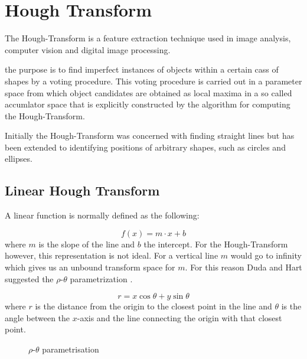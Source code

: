 \documentclass[11pt,twoside]{scrreprt}
\begin{document}

\section{Hough Transform} %
\label{sec:hough_transform}

The Hough-Transform is a feature extraction technique used in image analysis, computer vision and digital image processing.

the purpose is to find imperfect instances of objects within a certain cass of shapes by a voting procedure. This voting procedure is carried out in a parameter space from which object candidates are obtained as local maxima in a so called accumlator space that is explicitly constructed by the algorithm for computing the Hough-Transform.

Initially the Hough-Transform was concerned with finding straight lines but has been extended to identifying positions of arbitrary shapes, such as circles and ellipses.

\subsection{Linear Hough Transform} %
\label{sub:linear_hough_transform}

A linear function is normally defined as the following:

\[
  f(x) = m\cdot x + b
\]
where $m$ is the slope of the line and $b$ the intercept. For the Hough-Transform however, this representation is not ideal. For a vertical line $m$ would go to infinity which gives us an unbound transform space for $m$. For this reason Duda and Hart suggested the $\rho\text{-}\theta$ parametrization \parencite{Duda:1972}.

\[
  r = x\cos\theta + y\sin\theta
\]
where $r$ is the distance from the origin to the closest point in the line and $\theta$ is the angle between the $x$-axis and the line connecting the origin with that closest point.

\begin{figure}[ht]
  \centering
  \caption{$\rho\text{-}\theta$ parametrisation}
  \label{fig:rhotheta}
\end{figure}
\end{document}

